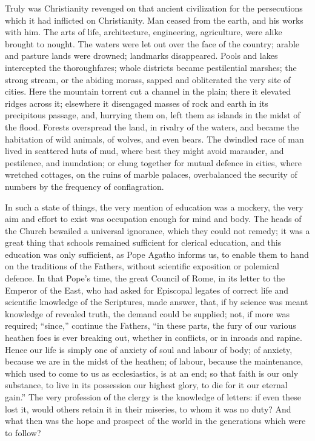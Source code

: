 Truly was Christianity revenged on that ancient civilization for
the persecutions which it had inflicted on Christianity. Man ceased
from the earth, and his works with him. The arts of life,
architecture, engineering, agriculture, were alike brought to nought.
The waters were let out over the face of the country; arable and
pasture lands were drowned; landmarks disappeared. Pools and
lakes intercepted the thoroughfares; whole districts became
pestilential marshes; the strong stream, or the abiding morass, sapped
and obliterated the very site of cities. Here the mountain torrent cut
a channel in the plain; there it elevated ridges across it; elsewhere
it disengaged masses of rock and earth in its precipitous passage,
and, hurrying them on, left them as islands in the midst of the flood.
Forests overspread the land, in rivalry of the waters, and became the
habitation of wild animals, of wolves, and even bears. The dwindled
race of man lived in scattered huts of mud, where best they might
avoid marauder, and pestilence, and inundation; or clung together for
mutual defence in cities, where wretched cottages, on the ruins of
marble palaces, overbalanced the security of numbers by the frequency
of conflagration.

In such a state of things, the very mention of education was a
mockery, the very aim and effort to exist was occupation enough for
mind and body. The heads of the Church bewailed a universal ignorance,
which they could not remedy; it was a great thing that schools
remained sufficient for clerical education, and this education was
only sufficient, as Pope Agatho informs us, to enable them to hand on
the traditions of the Fathers, without scientific exposition or
polemical defence. In that Pope's time, the great Council of Rome, in
its letter to the Emperor of the East, who had asked for Episcopal
legates of correct life and scientific knowledge of the Scriptures,
made answer, that, if by science was meant knowledge of revealed
truth, the demand could be supplied; not, if more was required;
``since,'' continue the Fathers, ``in these parts, the
fury of our various heathen foes is ever breaking out, whether in
conflicts, or in inroads and rapine. Hence our life is simply one of
anxiety of soul and labour of body; of anxiety, because we are
in the midst of the heathen; of labour, because the maintenance, which
used to come to us as ecclesiastics, is at an end; so that faith is
our only substance, to live in its possession our highest glory, to
die for it our eternal gain.'' The very profession of the clergy
is the knowledge of letters: if even these lost it, would others
retain it in their miseries, to whom it was no duty? And what then was
the hope and prospect of the world in the generations which were to
follow?

